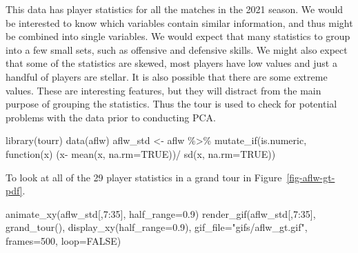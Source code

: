 \documentclass[
  letterpaper,
]{krantz}
\newenvironment{Shaded}{\begin{snugshade}}{\end{snugshade}}
\newcommand{\AttributeTok}[1]{\textcolor[rgb]{0.40,0.45,0.13}{#1}}
\newcommand{\ConstantTok}[1]{\textcolor[rgb]{0.56,0.35,0.01}{#1}}
\newcommand{\ControlFlowTok}[1]{\textcolor[rgb]{0.00,0.23,0.31}{#1}}
\newcommand{\DecValTok}[1]{\textcolor[rgb]{0.68,0.00,0.00}{#1}}
\newcommand{\FloatTok}[1]{\textcolor[rgb]{0.68,0.00,0.00}{#1}}
\newcommand{\FunctionTok}[1]{\textcolor[rgb]{0.28,0.35,0.67}{#1}}
\newcommand{\NormalTok}[1]{\textcolor[rgb]{0.00,0.23,0.31}{#1}}
\newcommand{\OtherTok}[1]{\textcolor[rgb]{0.00,0.23,0.31}{#1}}
\newcommand{\SpecialCharTok}[1]{\textcolor[rgb]{0.37,0.37,0.37}{#1}}
\newcommand{\StringTok}[1]{\textcolor[rgb]{0.13,0.47,0.30}{#1}}
\begin{document}

This data has player statistics for all the matches in the 2021 season.
We would be interested to know which variables contain similar
information, and thus might be combined into single variables. We would
expect that many statistics to group into a few small sets, such as
offensive and defensive skills. We might also expect that some of the
statistics are skewed, most players have low values and just a handful
of players are stellar. It is also possible that there are some extreme
values. These are interesting features, but they will distract from the
main purpose of grouping the statistics. Thus the tour is used to check
for potential problems with the data prior to conducting PCA.

\begin{Shaded}
\begin{Highlighting}[]
\FunctionTok{library}\NormalTok{(tourr)}
\FunctionTok{data}\NormalTok{(aflw)}
\NormalTok{aflw\_std }\OtherTok{\textless{}{-}}\NormalTok{ aflw }\SpecialCharTok{\%\textgreater{}\%}
  \FunctionTok{mutate\_if}\NormalTok{(is.numeric, }\ControlFlowTok{function}\NormalTok{(x) (x}\SpecialCharTok{{-}}
      \FunctionTok{mean}\NormalTok{(x, }\AttributeTok{na.rm=}\ConstantTok{TRUE}\NormalTok{))}\SpecialCharTok{/}
      \FunctionTok{sd}\NormalTok{(x, }\AttributeTok{na.rm=}\ConstantTok{TRUE}\NormalTok{))}
\end{Highlighting}
\end{Shaded}

To look at all of the 29 player statistics in a grand tour in
Figure~\ref{fig-aflw-gt-pdf}.

\begin{Shaded}
\begin{Highlighting}[]
\FunctionTok{animate\_xy}\NormalTok{(aflw\_std[,}\DecValTok{7}\SpecialCharTok{:}\DecValTok{35}\NormalTok{], }\AttributeTok{half\_range=}\FloatTok{0.9}\NormalTok{)}
\FunctionTok{render\_gif}\NormalTok{(aflw\_std[,}\DecValTok{7}\SpecialCharTok{:}\DecValTok{35}\NormalTok{], }
           \FunctionTok{grand\_tour}\NormalTok{(), }
           \FunctionTok{display\_xy}\NormalTok{(}\AttributeTok{half\_range=}\FloatTok{0.9}\NormalTok{),}
           \AttributeTok{gif\_file=}\StringTok{"gifs/aflw\_gt.gif"}\NormalTok{,}
           \AttributeTok{frames=}\DecValTok{500}\NormalTok{,}
           \AttributeTok{loop=}\ConstantTok{FALSE}\NormalTok{)}
\end{Highlighting}
\end{Shaded}
\end{document}
